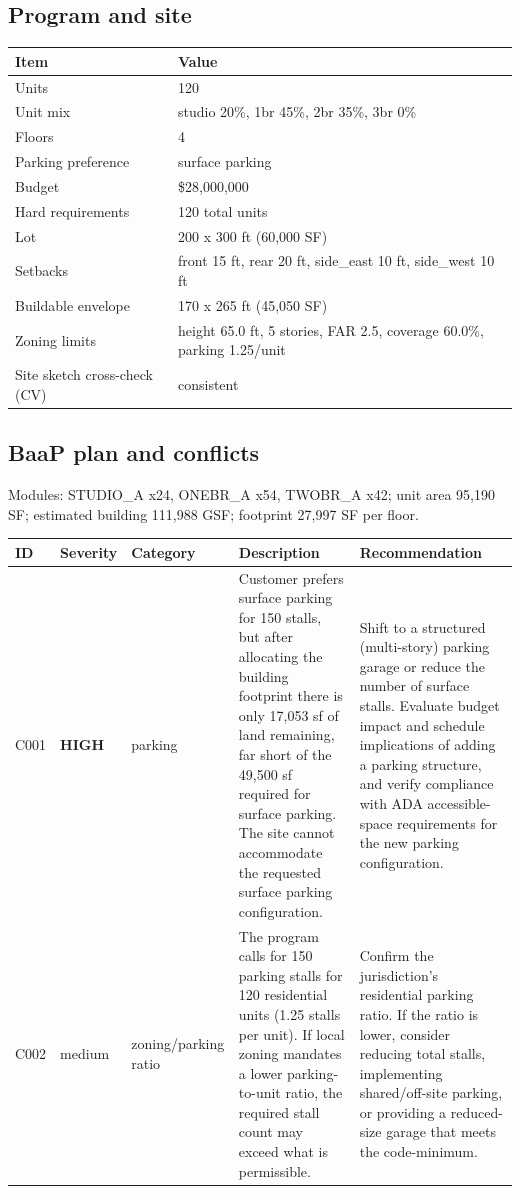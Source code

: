 \documentclass[10pt]{article}
\begin{document}
\subsection{Program and site}
{\small \begin{longtable}{p{4.2cm}p{11.8cm}}
\toprule
\textbf{Item} & \textbf{Value} \\ \midrule \endhead
Units & 120 \\
Unit mix & studio 20\%, 1br 45\%, 2br 35\%, 3br 0\% \\
Floors & 4 \\
Parking preference & surface parking \\
Budget & \$28,000,000 \\
Hard requirements & 120 total units \\
Lot & 200 x 300 ft (60,000 SF) \\
Setbacks & front 15 ft, rear 20 ft, side\_east 10 ft, side\_west 10 ft \\
Buildable envelope & 170 x 265 ft (45,050 SF) \\
Zoning limits & height 65.0 ft, 5 stories, FAR 2.5, coverage 60.0\%, parking 1.25/unit \\
Site sketch cross-check (CV) & consistent \\
\bottomrule
\end{longtable}}

\subsection{BaaP plan and conflicts}
Modules: STUDIO\_A x24, ONEBR\_A x54, TWOBR\_A x42; unit area 95,190 SF;
estimated building 111,988 GSF; footprint 27,997 SF per floor.

{\small \begin{longtable}{p{1cm}p{1.4cm}p{1.8cm}p{5.6cm}p{5.6cm}}
\toprule
\textbf{ID} & \textbf{Severity} & \textbf{Category} & \textbf{Description} & \textbf{Recommendation} \\ \midrule \endhead
C001 & \textcolor{muted}{\textbf{HIGH}} & parking & Customer prefers surface parking for 150 stalls, but after allocating the building footprint there is only 17,053 sf of land remaining, far short of the 49,500 sf required for surface parking. The site cannot accommodate the requested surface parking configuration. & Shift to a structured (multi-story) parking garage or reduce the number of surface stalls. Evaluate budget impact and schedule implications of adding a parking structure, and verify compliance with ADA accessible-space requirements for the new parking configuration. \\
C002 & medium & zoning/parking ratio & The program calls for 150 parking stalls for 120 residential units (1.25 stalls per unit). If local zoning mandates a lower parking-to-unit ratio, the required stall count may exceed what is permissible. & Confirm the jurisdiction’s residential parking ratio. If the ratio is lower, consider reducing total stalls, implementing shared/off-site parking, or providing a reduced-size garage that meets the code-minimum. \\
\bottomrule
\end{longtable}}
\end{document}

